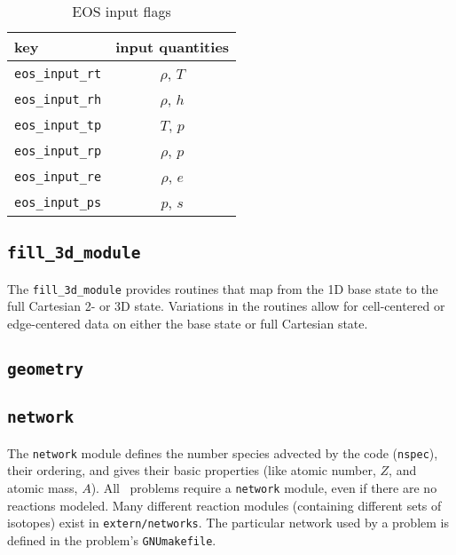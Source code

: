    \begin{table}[h]
   \caption{\label{arch:table:eosinput} EOS input flags}
   \begin{center}
   \begin{tabular}{lc}
   \hline
   key            & input quantities \\
   \hline
   {\tt eos\_input\_rt}       & $\rho$, $T$ \\
   {\tt eos\_input\_rh}       & $\rho$, $h$ \\
   {\tt eos\_input\_tp}       & $T$, $p$ \\
   {\tt eos\_input\_rp}       & $\rho$, $p$ \\
   {\tt eos\_input\_re}       & $\rho$, $e$ \\
   {\tt eos\_input\_ps}       & $p$, $s$ \\
   \hline
   \end{tabular}
   \end{center}
   \end{table}



\subsection{{\tt fill\_3d\_module}}

The {\tt fill\_3d\_module} provides routines that map from the 1D
base state to the full Cartesian 2- or 3D state.  Variations in the
routines allow for cell-centered or edge-centered data on either the
base state or full Cartesian state.

\subsection{{\tt geometry}}

\subsection{{\tt network}}

The {\tt network} module defines the number species advected by the
code ({\tt nspec}), their ordering, and gives their basic properties
(like atomic number, $Z$, and atomic mass, $A$).  All \maestro\ problems
require a {\tt network} module, even if there are no reactions
modeled.  Many different reaction modules (containing different sets
of isotopes) exist in {\tt extern/networks}.  The particular network
used by a problem is defined in the problem's {\tt GNUmakefile}.

